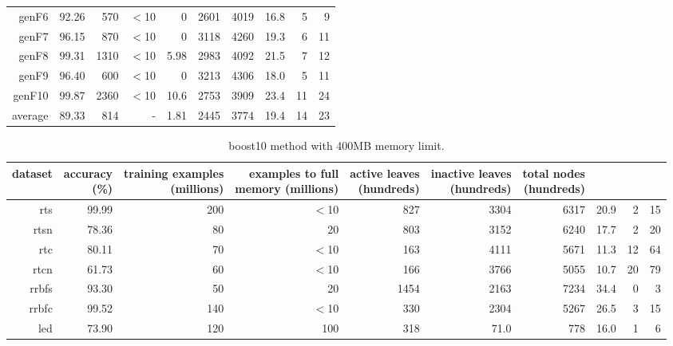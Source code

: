 \begin{table}
\begin{tabular}{|r|r|r|r|r|r|r|r|r|r|}
{\sc genF6} & 92.26 & 570 & $<$10 & 0 & 2601 & 4019 & 16.8 & 5 & 9 \\
{\sc genF7} & 96.15 & 870 & $<$10 & 0 & 3118 & 4260 & 19.3 & 6 & 11 \\
{\sc genF8} & 99.31 & 1310 & $<$10 & 5.98 & 2983 & 4092 & 21.5 & 7 & 12 \\
{\sc genF9} & 96.40 & 600 & $<$10 & 0 & 3213 & 4306 & 18.0 & 5 & 11 \\
{\sc genF10} & 99.87 & 2360 & $<$10 & 10.6 & 2753 & 3909 & 23.4 & 11 & 24 \\
\hline
average & 89.33 & 814 &  -  & 1.81 & 2445 & 3774 & 19.4 & 14 & 23 \\
\hline
\end{tabular}
\end{table}
\clearpage
\begin{table}
\caption{{\sc boost10} method with 400MB memory limit.}
\label{tab:boost10-400MB}
\centering
\begin{tabular}{|r|r|r|r|r|r|r|r|r|r|}
\hline
dataset	&
\rotatebox{90}{\parbox{9em}{accuracy\\(\%)}} &
\rotatebox{90}{\parbox{9em}{training examples\\(millions)}} &
\rotatebox{90}{\parbox{9em}{examples to full\\memory (millions)}} &
\rotatebox{90}{\parbox{9em}{active leaves\\(hundreds)}} &
\rotatebox{90}{\parbox{9em}{inactive leaves\\(hundreds)}} &
\rotatebox{90}{\parbox{9em}{total nodes\\(hundreds)}} &
\rotatebox{90}{\parbox{9em}{average tree depth}}	&
\rotatebox{90}{\parbox{9em}{training speed (\%)}} &
\rotatebox{90}{\parbox{9em}{prediction speed (\%)}} \\
\hline
{\sc rts} & 99.99 & 200 & $<$10 & 827 & 3304 & 6317 & 20.9 & 2 & 15 \\
{\sc rtsn} & 78.36 & 80 & 20 & 803 & 3152 & 6240 & 17.7 & 2 & 20 \\
{\sc rtc} & 80.11 & 70 & $<$10 & 163 & 4111 & 5671 & 11.3 & 12 & 64 \\
{\sc rtcn} & 61.73 & 60 & $<$10 & 166 & 3766 & 5055 & 10.7 & 20 & 79 \\
{\sc rrbfs} & 93.30 & 50 & 20 & 1454 & 2163 & 7234 & 34.4 & 0 & 3 \\
{\sc rrbfc} & 99.52 & 140 & $<$10 & 330 & 2304 & 5267 & 26.5 & 3 & 15 \\
{\sc led} & 73.90 & 120 & 100 & 318 & 71.0 & 778 & 16.0 & 1 & 6 \\

\end{tabular}
\end{table}
